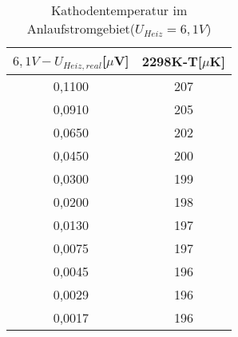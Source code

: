 \begin{table}[h]
	\begin{center}
		\begin{tabular}{cc}
			$6{,}1V-U_{Heiz,real}$[$\mu$V]&2298K-T[$\mu$K] \\ \hline
			0,1100&207 \\
			0,0910&205\\
			0,0650&202\\
			0,0450&200\\
			0,0300&199\\
			0,0200&198\\
			0,0130&197\\
			0,0075&197\\
			0,0045&196\\
			0,0029&196\\
			0,0017&196
		\end{tabular}
		\caption{Kathodentemperatur im Anlaufstromgebiet($U_{Heiz}=6,1V$)}
		\label{tabanlauft}
	\end{center}
\end{table}